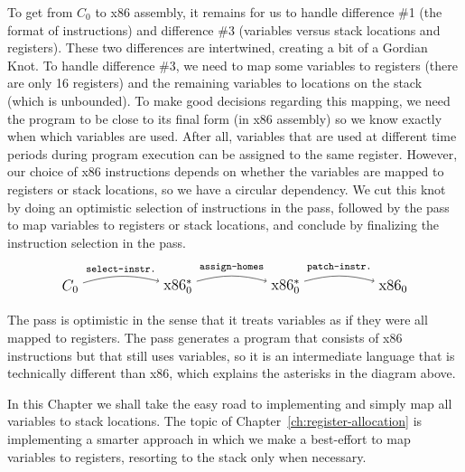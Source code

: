 \documentclass[11pt]{book}
\begin{document}
To get from $C_0$ to x86 assembly, it remains for us to handle
difference \#1 (the format of instructions) and difference \#3
(variables versus stack locations and registers). These two
differences are intertwined, creating a bit of a Gordian Knot. To
handle difference \#3, we need to map some variables to registers
(there are only 16 registers) and the remaining variables to locations
on the stack (which is unbounded). To make good decisions regarding
this mapping, we need the program to be close to its final form (in
x86 assembly) so we know exactly when which variables are used. After
all, variables that are used at different time periods during program
execution can be assigned to the same register.  However, our choice
of x86 instructions depends on whether the variables are mapped to
registers or stack locations, so we have a circular dependency. We cut
this knot by doing an optimistic selection of instructions in the
 pass, followed by the 
pass to map variables to registers or stack locations, and conclude by
finalizing the instruction selection in the 
pass.
\[
\begin{tikzpicture}[baseline=(current  bounding  box.center)]
\node (1) at (0,0)  {\large $C_0$};
\node (2) at (3,0)  {\large $\text{x86}^{*}_0$};
\node (3) at (6,0)  {\large $\text{x86}^{*}_0$};
\node (4) at (9,0) {\large $\text{x86}_0$};

\path[->,bend left=15] (1) edge [above] node {\ttfamily\footnotesize select-instr.} (2);
\path[->,bend left=15] (2) edge [above] node {\ttfamily\footnotesize assign-homes} (3);
\path[->,bend left=15] (3) edge [above] node {\ttfamily\footnotesize patch-instr.} (4);
\end{tikzpicture}
\]

The  pass is optimistic in the sense that it
treats variables as if they were all mapped to registers. The
 pass generates a program that consists of
x86 instructions but that still uses variables, so it is an
intermediate language that is technically different than x86, which
explains the asterisks in the diagram above.

In this Chapter we shall take the easy road to implementing
 and simply map all variables to stack locations.
The topic of Chapter~\ref{ch:register-allocation} is implementing a
smarter approach in which we make a best-effort to map variables to
registers, resorting to the stack only when necessary.
\end{document}

